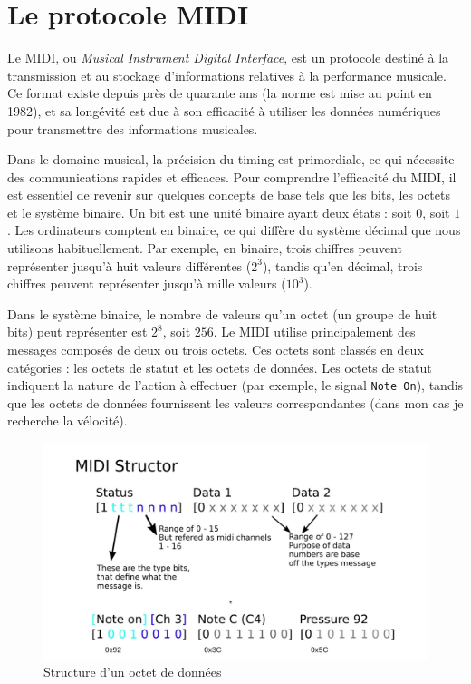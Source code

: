\section{Le protocole MIDI}

Le MIDI, ou \textit{Musical Instrument Digital Interface}, est un protocole destiné à la transmission et au stockage d'informations relatives à la performance musicale. Ce format existe depuis près de quarante ans (la norme est mise au point en 1982), et sa longévité est due à son efficacité à utiliser les données numériques pour transmettre des informations musicales.

Dans le domaine musical, la précision du timing est primordiale, ce qui nécessite des communications rapides et efficaces. Pour comprendre l'efficacité du MIDI, il est essentiel de revenir sur quelques concepts de base tels que les bits, les octets et le système binaire. Un bit est une unité binaire ayant deux états : soit $0$, soit $1$. Les ordinateurs comptent en binaire, ce qui diffère du système décimal que nous utilisons habituellement. Par exemple, en binaire, trois chiffres peuvent représenter jusqu'à huit valeurs différentes ($2^3$), tandis qu'en décimal, trois chiffres peuvent représenter jusqu'à mille valeurs ($10^3$).

Dans le système binaire, le nombre de valeurs qu'un octet (un groupe de huit bits) peut représenter est $2^8$, soit $256$. Le MIDI utilise principalement des messages composés de deux ou trois octets. Ces octets sont classés en deux catégories : les octets de statut et les octets de données. Les octets de statut indiquent la nature de l'action à effectuer (par exemple, le signal \lstinline{Note On}), tandis que les octets de données fournissent les valeurs correspondantes (dans mon cas je recherche la vélocité).

\begin{figure}[h]
    \centering
    \includegraphics[width=12cm]{images/experiments/midi00.jpg}
    \caption{Structure d'un octet de données}
    \label{midi00}
\end{figure}


